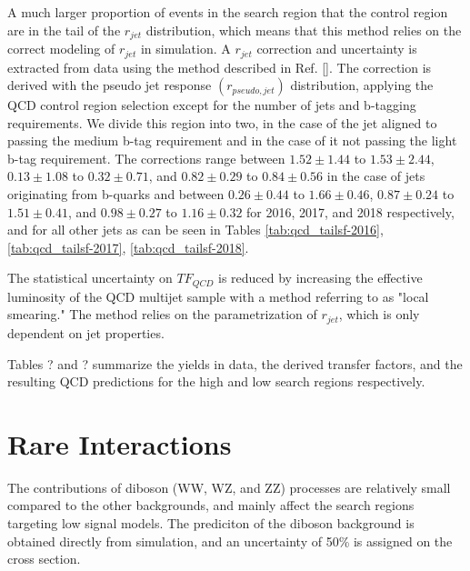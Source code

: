 A much larger proportion of events in the search region that the control region are in the tail of the $r_{jet}$ distribution, which means that this method relies on the correct modeling of $r_{jet}$ in simulation. A $r_{jet}$ correction and uncertainty is extracted from data using the method described in Ref. []. The correction is derived with the pseudo jet response $(r_{pseudo,jet})$ distribution, applying the QCD control region selection except for the number of jets and b-tagging requirements. We divide this region into two, in the case of the jet aligned to \met{} passing the medium b-tag requirement and in the case of it not passing the light b-tag requirement. The corrections range between $1.52\pm1.44$ to $1.53\pm2.44$, $0.13\pm1.08$ to $0.32\pm0.71$, and $0.82\pm0.29$ to $0.84\pm0.56$ in the case of jets originating from b-quarks and between $0.26\pm0.44$ to $1.66\pm0.46$, $0.87\pm0.24$ to $1.51\pm0.41$, and $0.98\pm0.27$ to $1.16\pm0.32$ for 2016, 2017, and 2018 respectively, and for all other jets as can be seen in Tables \ref{tab:qcd_tailsf-2016}, \ref{tab:qcd_tailsf-2017}, \ref{tab:qcd_tailsf-2018}.



The statistical uncertainty on $TF_{QCD}$ is reduced by increasing the effective luminosity of the QCD multijet sample with a method referring to as "local smearing." The method relies on the parametrization of $r_{jet}$, which is only dependent on jet properties.

Tables ? and ? summarize the yields in data, the derived transfer factors, and the resulting QCD predictions for the high \dm{} and low \dm{} search regions respectively. 




\section{Rare Interactions}
\label{subsec:rare}

The contributions of diboson (WW, WZ, and ZZ) processes are relatively small compared to the other backgrounds, and mainly affect the search regions targeting low \dm{} signal models. The prediciton of the diboson background is obtained directly from simulation, and an uncertainty of 50\% is assigned on the cross section.

